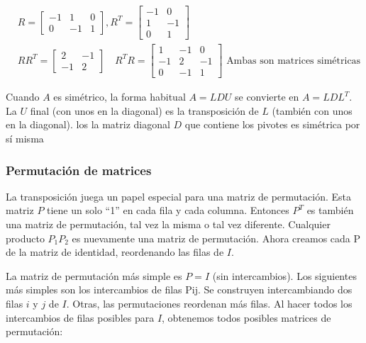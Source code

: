 \begin{example}
	\begin{align*}
		 & R=\begin{bmatrix}
			     -1 & 1 & 0 \\0&-1&1
		     \end{bmatrix}, R^T=\begin{bmatrix}
			                        -1 & 0 \\1&-1\\0&1
		                        \end{bmatrix}                                          \\
		 & RR^T=\begin{bmatrix}
			        2 & -1 \\-1&2
		        \end{bmatrix}\quad R^TR=\begin{bmatrix}
			                                1 & -1 & 0 \\-1&2&-1\\0&-1&1
		                                \end{bmatrix}\text{ Ambas son matrices simétricas}
	\end{align*}
\end{example}

Cuando $A$ es simétrico, la forma habitual $A = LDU$ se convierte en $A = LDL^T$. La $U$ final
(con unos en la diagonal) es la transposición de $L$ (también con unos en la diagonal). los
la matriz diagonal $D$ que contiene los pivotes es simétrica por sí misma

\subsubsection{Permutación de matrices}

La transposición juega un papel especial para una matriz de permutación. Esta matriz $P$ tiene un solo ``1''
en cada fila y cada columna. Entonces $P^T$ es también una matriz de permutación, tal vez la misma
o tal vez diferente. Cualquier producto $P_1 P_2$ es nuevamente una matriz de permutación. Ahora creamos cada
P de la matriz de identidad, reordenando las filas de $I$.

La matriz de permutación más simple es $P = I$ (sin intercambios). Los siguientes más simples son los
intercambios de filas Pij. Se construyen intercambiando dos filas $i$ y $j$ de $I$. Otras,
las permutaciones reordenan más filas. Al hacer todos los intercambios de filas posibles para $I$, obtenemos todos
posibles matrices de permutación:


